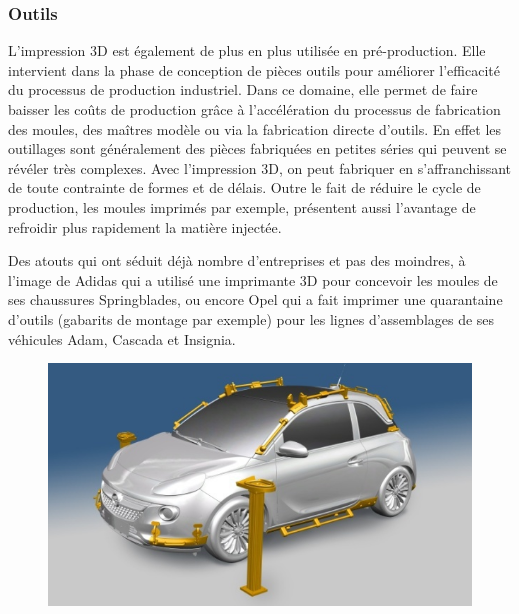 \documentclass{article}
\begin{document}
\subsubsection{Outils}
L'impression 3D est également de plus en plus utilisée en pré-production. Elle intervient dans la phase de conception de pièces outils pour améliorer l'efficacité du processus de production industriel. Dans ce domaine, elle permet de faire baisser les coûts de production grâce à l'accélération du processus de fabrication des moules, des maîtres modèle ou via la fabrication directe d'outils. En effet les outillages sont généralement des pièces fabriquées en petites séries qui peuvent se révéler très complexes. Avec l'impression 3D, on peut fabriquer en s'affranchissant de toute contrainte de formes et de délais. Outre le fait de réduire le cycle de production, les moules imprimés par exemple, présentent aussi l'avantage de refroidir plus rapidement la matière injectée. \hfill

Des atouts qui ont séduit déjà nombre d'entreprises et pas des moindres, à l'image de Adidas qui a utilisé une imprimante 3D pour concevoir les moules de ses chaussures Springblades, ou encore Opel qui a fait imprimer une quarantaine d'outils (gabarits de montage par exemple) pour les lignes d'assemblages de ses véhicules Adam, Cascada et Insignia.

\begin{figure}[h!]
\centering
\includegraphics[scale=0.4]{./images/opel-impression-3d.png}
\end{figure}\hfill
\newpage
\end{document}
